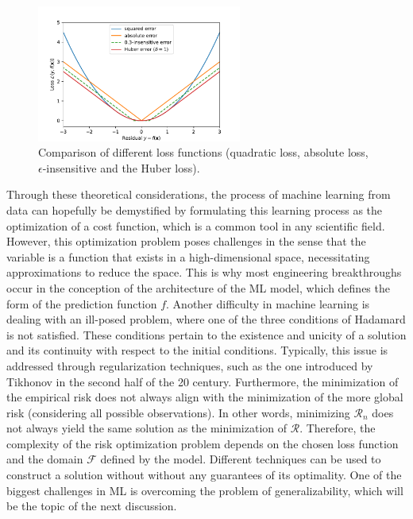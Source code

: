 \documentclass[main]{subfiles}
\begin{document}
\begin{figure}[ht]
  \centering
    \includegraphics[width=0.6\textwidth]{figures/4-ml/loss_comparison.pdf}
    \caption{Comparison of different loss functions (quadratic loss, absolute loss, $\epsilon$-insensitive and the Huber loss). }\label{fgr:loss_comp}
\end{figure}

Through these theoretical considerations, the process of machine learning from data can hopefully be demystified by formulating this learning process as the optimization of a cost function, which is a common tool in any scientific field. However, this optimization problem poses challenges in the sense that the variable is a function that exists in a high-dimensional space, necessitating approximations to reduce the space. This is why most engineering breakthroughs occur in the conception of the architecture of the ML model, which defines the form of the prediction function $f$. Another difficulty in machine learning is dealing with an ill-posed problem, where one of the three conditions of Hadamard is not satisfied. These conditions pertain to the existence and unicity of a solution and its continuity with respect to the initial conditions. Typically, this issue is addressed through regularization techniques, such as the one introduced by Tikhonov in the second half of the 20 century. Furthermore, the minimization of the empirical risk does not always align with the minimization of the more global risk (considering all possible observations). In other words, minimizing $\mathcal{R}_n$ does not always yield the same solution as the minimization of $\mathcal{R}$. Therefore, the complexity of the risk optimization problem depends on the chosen loss function and the domain $\mathcal{F}$ defined by the model. Different techniques can be used to construct a solution without without any guarantees of its optimality. One of the biggest challenges in ML is overcoming the problem of generalizability, which will be the topic of the next discussion. 
\end{document}
